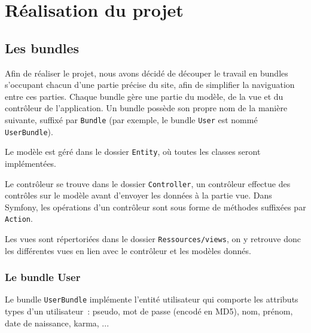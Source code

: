 \chapter{Réalisation du projet}

\section{Les bundles}

Afin de réaliser le projet, nous avons décidé de découper le travail en bundles s'occupant chacun d'une partie précise du site, afin de simplifier la naviguation entre ces parties.
Chaque bundle gère une partie du modèle, de la vue et du contrôleur de l'application. Un bundle possède son propre nom de la manière suivante, suffixé par \verb|Bundle| (par exemple, le bundle \verb|User| est nommé \verb|UserBundle|).

Le modèle est géré dans le dossier \verb|Entity|, où toutes les classes seront implémentées.

Le contrôleur se trouve dans le dossier \verb|Controller|, un contrôleur effectue des contrôles sur le modèle avant d'envoyer les données à la partie vue.
Dans Symfony, les opérations d'un contrôleur sont sous forme de méthodes suffixées par \verb|Action|.

Les vues sont répertoriées dans le dossier \verb|Ressources/views|, on y retrouve donc les différentes vues en lien avec le contrôleur et les modèles donnés.


\subsection{Le bundle User}

Le bundle \verb|UserBundle| implémente l'entité utilisateur qui comporte les attributs types d'un utilisateur~: pseudo, mot de passe (encodé en MD5), nom, prénom, date de naissance, karma, ...

